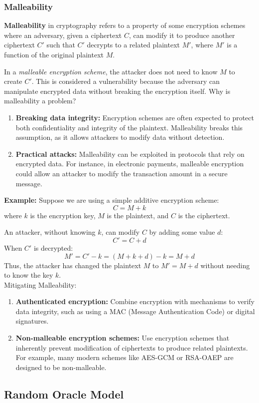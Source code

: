 \subsubsection{Malleability}
\textbf{Malleability} in cryptography refers to a property of some encryption schemes where an adversary, given a ciphertext \( C \), can modify it to produce another ciphertext \( C' \) such that \( C' \) decrypts to a related plaintext \( M' \), where \( M' \) is a function of the original plaintext \( M \). 

In a \textit{malleable encryption scheme}, the attacker does not need to know \( M \) to create \( C' \). This is considered a vulnerability because the adversary can manipulate encrypted data without breaking the encryption itself.
Why is malleability a problem?

\begin{enumerate}
    \item \textbf{Breaking data integrity:} Encryption schemes are often expected to protect both confidentiality and integrity of the plaintext. Malleability breaks this assumption, as it allows attackers to modify data without detection.
    \item \textbf{Practical attacks:} Malleability can be exploited in protocols that rely on encrypted data. For instance, in electronic payments, malleable encryption could allow an attacker to modify the transaction amount in a secure message.
\end{enumerate}

\textbf{Example:}
Suppose we are using a simple additive encryption scheme:
\[
C = M + k
\]
where \( k \) is the encryption key, \( M \) is the plaintext, and \( C \) is the ciphertext.

An attacker, without knowing \( k \), can modify \( C \) by adding some value \( d \):
\[
C' = C + d
\]
When \( C' \) is decrypted:
\[
M' = C' - k = (M + k + d) - k = M + d
\]
Thus, the attacker has changed the plaintext \( M \) to \( M' = M + d \) without needing to know the key \( k \). \\

Mitigating Malleability:
\begin{enumerate}
    \item \textbf{Authenticated encryption:} Combine encryption with mechanisms to verify data integrity, such as using a MAC (Message Authentication Code) or digital signatures.
    \item \textbf{Non-malleable encryption schemes:} Use encryption schemes that inherently prevent modification of ciphertexts to produce related plaintexts. For example, many modern schemes like AES-GCM or RSA-OAEP are designed to be non-malleable.
\end{enumerate}

\subsection{Random Oracle Model}
